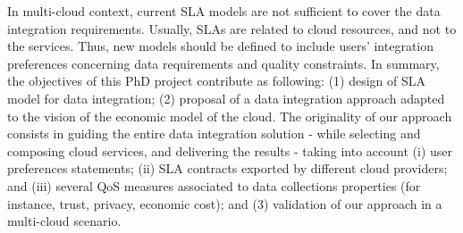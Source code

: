In multi-cloud context, current SLA models are not sufficient to cover the data integration requirements. Usually, SLAs are related to cloud resources, and not to the services. Thus, new models should be defined to include users' integration preferences concerning data requirements and quality constraints. In summary, the objectives of this PhD project contribute as following: (1) design of SLA model for data integration; (2) proposal of a data integration approach adapted to the vision of the economic model of the cloud. The originality of our approach consists in guiding the entire data integration solution - while selecting and composing cloud services, and delivering the results - taking into account (i) user preferences statements; (ii) SLA contracts exported by different cloud providers; and (iii) several QoS measures associated to data collections properties (for instance, trust, privacy, economic cost); and (3) validation of our approach in a multi-cloud scenario.
